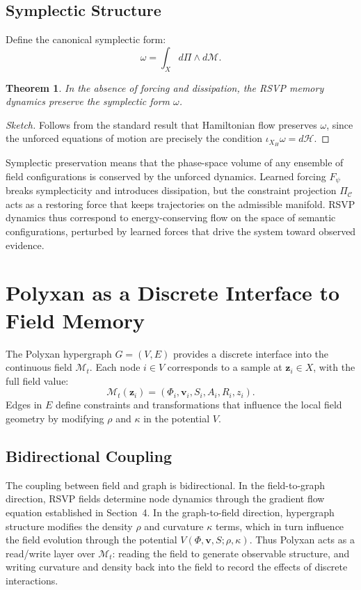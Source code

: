 \documentclass[11pt]{article}
\newtheorem{theorem}{Theorem}[section]
\begin{document}
\subsection{Symplectic Structure}

Define the canonical symplectic form:
\[
\omega = \int_X d\Pi \wedge d\mathcal{M}.
\]

\begin{theorem}
In the absence of forcing and dissipation, the RSVP memory dynamics
preserve the symplectic form $\omega$.
\end{theorem}

\begin{proof}[Sketch]
Follows from the standard result that Hamiltonian flow preserves $\omega$,
since the unforced equations of motion are precisely the condition
$\iota_{X_H}\omega = d\mathcal{H}$.
\end{proof}

Symplectic preservation means that the phase-space volume of any ensemble
of field configurations is conserved by the unforced dynamics.
Learned forcing $F_\psi$ breaks symplecticity and introduces dissipation,
but the constraint projection $\Pi_{\mathcal{C}}$ acts as a restoring
force that keeps trajectories on the admissible manifold.
RSVP dynamics thus correspond to energy-conserving flow on the space of
semantic configurations, perturbed by learned forces that drive the system
toward observed evidence.

\section{Polyxan as a Discrete Interface to Field Memory}

The Polyxan hypergraph $G=(V,E)$ provides a discrete interface into the
continuous field $\mathcal{M}_t$.
Each node $i \in V$ corresponds to a sample at $\mathbf{z}_i \in X$, with
the full field value:
\[
\mathcal{M}_t(\mathbf{z}_i)
=
(\Phi_i, \mathbf{v}_i, S_i, A_i, R_i, z_i).
\]
Edges in $E$ define constraints and transformations that influence the
local field geometry by modifying $\rho$ and $\kappa$ in the potential $V$.

\subsection{Bidirectional Coupling}

The coupling between field and graph is bidirectional.
In the field-to-graph direction, RSVP fields determine node dynamics through
the gradient flow equation established in Section~4.
In the graph-to-field direction, hypergraph structure modifies the density
$\rho$ and curvature $\kappa$ terms, which in turn influence the field
evolution through the potential $V(\Phi,\mathbf{v},S;\rho,\kappa)$.
Thus Polyxan acts as a read/write layer over $\mathcal{M}_t$: reading the
field to generate observable structure, and writing curvature and density
back into the field to record the effects of discrete interactions.
\end{document}
